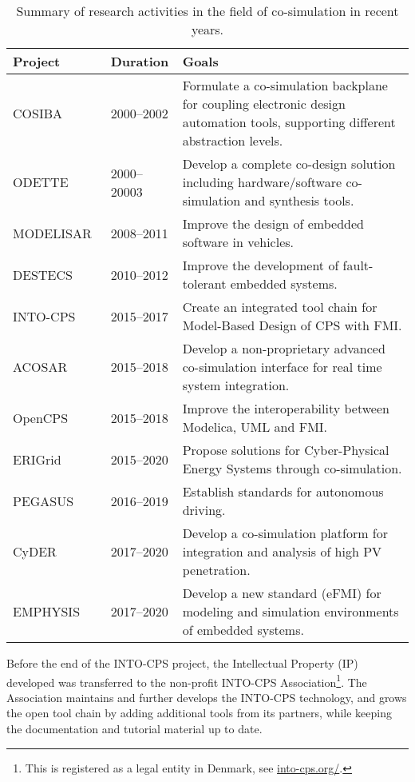 \begin{table}[htb]
  \scriptsize
  \caption{Summary of research activities in the field of co-simulation in recent years. }
  \label{tab:projects}
  \begin{tabular}{llp{}}
  \textbf{Project} & \textbf{Duration} & \textbf{Goals} \\ \hline
  COSIBA~\cite{cosibas} & 2000--2002 &  Formulate a co-simulation backplane for coupling electronic design automation tools,  supporting different abstraction levels. \\
  ODETTE~\cite{odette} & 2000--20003 &  Develop a complete co-design solution including hardware/software co-simulation and synthesis tools. \\
  MODELISAR~\cite{modelisar} & 2008--2011 &  Improve the design of embedded software in vehicles. \\
  DESTECS~\cite{destecs} & 2010--2012 &  Improve the development of fault-tolerant embedded systems. \\
  INTO-CPS~\cite{intocps} & 2015--2017 &  Create an integrated tool chain for Model-Based Design of CPS with FMI.  \\
  ACOSAR~\cite{acosar} & 2015--2018 &  Develop a non-proprietary advanced co-simulation interface for real time system integration.  \\
  OpenCPS~\cite{opencps} & 2015--2018 &  Improve the interoperability between Modelica, UML and FMI.  \\
  ERIGrid~\cite{erigrid} & 2015--2020 &  Propose solutions for Cyber-Physical Energy Systems through co-simulation.  \\
  PEGASUS~\cite{pegasus} & 2016--2019 &  Establish standards for autonomous driving. \\
  CyDER~\cite{cyder} & 2017--2020 &  Develop a co-simulation platform for integration and analysis of high PV penetration. \\
  EMPHYSIS~\cite{emphysis} & 2017--2020 &  Develop a new standard (eFMI) for modeling and simulation environments of embedded systems.  \\ 
  \hline
  \end{tabular}%
\end{table}


Before the end of the INTO-CPS project, the Intellectual Property (IP) developed was transferred to the non-profit INTO-CPS Association\footnote{This is registered as a legal entity in Denmark, see \url{into-cps.org/}.}. The Association maintains and further develops the INTO-CPS technology, and grows the open tool chain by adding additional tools from its partners, while keeping the documentation and tutorial material up to date. 

